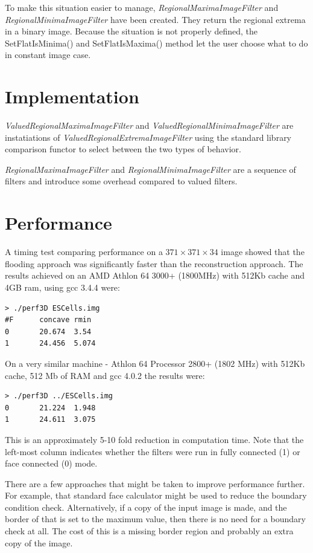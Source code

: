 \documentclass{InsightArticle}
\begin{document}
To make this situation easier to manage, {\em RegionalMaximaImageFilter} and
{\em RegionalMinimaImageFilter} have been created. They return the regional
extrema in a binary image. Because the situation is not properly defined, the 
SetFlatIsMinima() and SetFlatIsMaxima() method let the user choose what to do
in constant image case.

\section{Implementation}
{\em ValuedRegionalMaximaImageFilter} and {\em
ValuedRegionalMinimaImageFilter} are instatiations of {\em
ValuedRegionalExtremaImageFilter} using the standard library
comparison functor to select between the two types of behavior.

{\em RegionalMaximaImageFilter} and {\em RegionalMinimaImageFilter} are a sequence
of filters and introduce some overhead compared to valued filters.

\section{Performance}
A timing test comparing performance on a $371 \times 371 \times 34$
image showed that the flooding approach was significantly faster than
the reconstruction approach. The results achieved on an AMD Athlon 64
3000+ (1800MHz) with 512Kb cache and 4GB ram, using gcc 3.4.4 were:
\begin{verbatim}
> ./perf3D ESCells.img
#F      concave rmin
0       20.674  3.54
1       24.456  5.074
\end{verbatim}
On a very similar machine - Athlon 64 Processor 2800+ (1802
MHz) with 512Kb cache, 512 Mb of RAM and gcc 4.0.2 the results were:
\begin{verbatim}
> ./perf3D ../ESCells.img
0       21.224  1.948
1       24.611  3.075
\end{verbatim}

This is an approximately 5-10 fold reduction in computation time. Note
that the left-most column indicates whether the filters were run in
fully connected (1) or face connected (0) mode.

There are a few approaches that might be taken to improve performance
further. For example, that standard face calculator might be used to
reduce the boundary condition check. Alternatively, if a copy of the
input image is made, and the border of that is set to the maximum
value, then there is no need for a boundary check at all. The cost of
this is a missing border region and probably an extra copy of the
image.
\end{document}

